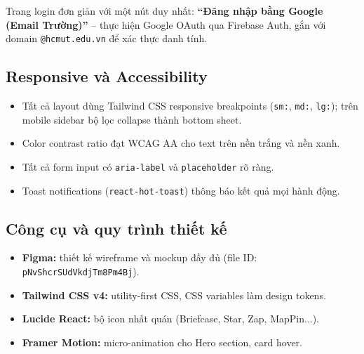 Trang login đơn giản với một nút duy nhất:
\textbf{``Đăng nhập bằng Google (Email Trường)''} -- thực hiện Google OAuth qua Firebase Auth,
gắn với domain \texttt{@hcmut.edu.vn} để xác thực danh tính.

\subsection{Responsive và Accessibility}

\begin{itemize}
  \item Tất cả layout dùng Tailwind CSS responsive breakpoints (\texttt{sm:}, \texttt{md:},
    \texttt{lg:}); trên mobile sidebar bộ lọc collapse thành bottom sheet.
  \item Color contrast ratio đạt WCAG AA cho text trên nền trắng và nền xanh.
  \item Tất cả form input có \texttt{aria-label} và \texttt{placeholder} rõ ràng.
  \item Toast notifications (\texttt{react-hot-toast}) thông báo kết quả mọi hành động.
\end{itemize}

\subsection{Công cụ và quy trình thiết kế}

\begin{itemize}
  \item \textbf{Figma:} thiết kế wireframe và mockup đầy đủ (file ID: \texttt{pNvShcrSUdVkdjTm8Pm4Bj}).
  \item \textbf{Tailwind CSS v4:} utility-first CSS, CSS variables làm design tokens.
  \item \textbf{Lucide React:} bộ icon nhất quán (Briefcase, Star, Zap, MapPin...).
  \item \textbf{Framer Motion:} micro-animation cho Hero section, card hover.
\end{itemize}
